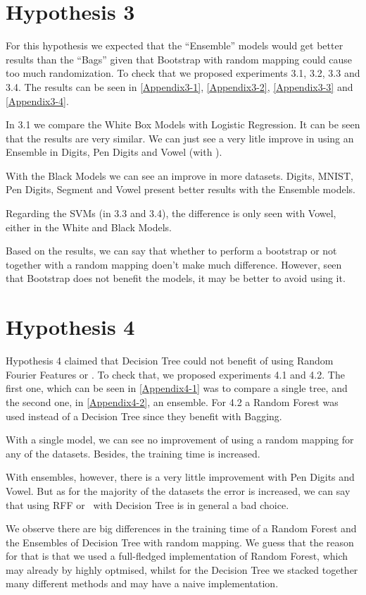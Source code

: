 \begin{pre-delivery}
\section*{Hypothesis 3}
\label{disc:h3}

For this hypothesis we expected that the ``Ensemble'' models would get
better results than the ``Bags'' given that Bootstrap with random mapping
could cause too much randomization. To check that we proposed experiments
3.1, 3.2, 3.3 and 3.4. The results can be seen in
\ref{Appendix3-1},
\ref{Appendix3-2},
\ref{Appendix3-3} and
\ref{Appendix3-4}.

In 3.1 we compare the White Box Models with Logistic Regression. It can be seen
that the results are very similar. We can just see a very litle improve in using
an Ensemble in Digits, Pen Digits and Vowel (with \Nys).

With the Black Models we can see an improve in more datasets.
Digits, MNIST, Pen Digits, Segment and Vowel present better results with the
Ensemble models.

Regarding the SVMs (in 3.3 and 3.4), the difference is only seen with Vowel,
either in the White and Black Models.

Based on the results, we can say that whether to perform a bootstrap or not
together with a random mapping doen't make much difference. However, seen
that Bootstrap does not benefit the models, it may be better to avoid using
it.

\section*{Hypothesis 4}
\label{disc:h4}
Hypothesis 4 claimed that Decision Tree could not benefit of using
Random Fourier Features or \Nys. To check that, we proposed experiments
4.1 and 4.2. The first one, which can be seen in \ref{Appendix4-1} was
to compare a single tree, and the second one, in \ref{Appendix4-2}, an
ensemble. For 4.2 a Random Forest was used instead of a Decision Tree since
they benefit with Bagging.

With a single model, we can see no improvement of using a random mapping for
any of the datasets. Besides, the training time is increased.

With ensembles, however, there is a very little improvement with
Pen Digits and Vowel. But as for the majority of the datasets the error is
increased, we can say that using RFF or \Nys\ with Decision Tree is in
general a bad choice.

We observe there are big differences in the training time of a Random Forest
and the Ensembles of Decision Tree with random mapping. We guess that the
reason for that is that
we used a full-fledged implementation of Random Forest, which may already
by highly optmised, whilst for the Decision Tree we stacked together
many different methods and may have a naive implementation.


\end{pre-delivery}

